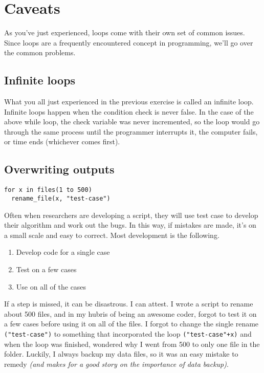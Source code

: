 \documentclass[
]{book}
\providecommand{\tightlist}{%
  \setlength{\itemsep}{0pt}\setlength{\parskip}{0pt}}
\begin{document}
\section{Caveats}\label{caveats}

As you've just experienced, loops come with their own set of common issues.\\
Since loops are a frequently encountered concept in programming, we'll go over the common problems.

\subsection{Infinite loops}\label{infinite-loops}

What you all just experienced in the previous exercise is called an infinite loop. Infinite loops happen when the condition check is never false. In the case
of the above while loop, the check variable was never incremented, so the loop would go through the same process until the programmer interrupts it, the computer fails, or time ends (whichever comes first).

\subsection{Overwriting outputs}\label{overwriting-outputs}

\begin{verbatim}
for x in files(1 to 500) 
  rename_file(x, "test-case")
\end{verbatim}

Often when researchers are developing a script, they will use test case to develop their algorithm and work out the bugs. In this way, if mistakes are made, it's on a small scale and easy to correct. Most development is the following.

\begin{enumerate}
\def\labelenumi{\arabic{enumi}.}
\tightlist
\item
  Develop code for a single case
\item
  Test on a few cases
\item
  Use on all of the cases
\end{enumerate}

If a step is missed, it can be disastrous. I can attest. I wrote a script to rename about 500 files, and in my hubris of being an awesome coder, forgot to test it on a few cases before using it on all of the files. I forgot to change the single rename \texttt{("test-case")} to something that incorporated the loop \texttt{("test-case"+x)} and when the loop was finished, wondered why I went from 500 to only one file in the folder. Luckily, I always backup my data files, so it was an easy mistake to remedy \emph{(and makes for a good story on the importance of data backup)}.
\end{document}
